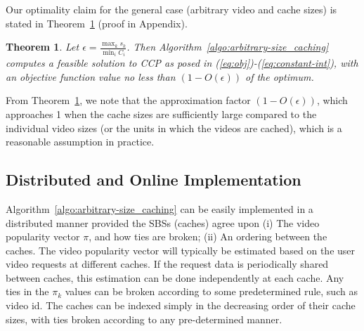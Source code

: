 \documentclass[conference]{IEEEtran}
\newtheorem{theorem}{Theorem}
\begin{document}
Our optimality claim for the general case (arbitrary video and cache sizes) is stated in Theorem~\ref{th:arbitrary-size} (proof in Appendix).

\begin{theorem}
\label{th:arbitrary-size}
Let $\epsilon = \frac{\max_k s_k}{\min_i C_i}$. Then Algorithm~\ref{algo:arbitrary-size_caching} computes a feasible solution to CCP as posed in (\ref{eq:obj})-(\ref{eq:constant-int}), with an objective function value no less than $(1 - O(\epsilon))$ of the optimum.
\end{theorem}

From Theorem~\ref{th:arbitrary-size}, we note that the approximation factor $(1 - O(\epsilon))$, which approaches 1 when the cache sizes are sufficiently large compared to the individual video sizes (or the units in which the videos are cached), which is a reasonable assumption in practice. 



\subsection{Distributed and Online Implementation}
Algorithm~\ref{algo:arbitrary-size_caching} can be easily implemented in a distributed manner provided the SBSs (caches) agree upon (i) The video popularity vector $\pi$, and how ties are broken; (ii) An ordering between the caches. The video popularity vector will typically be estimated based on the user video requests at different caches. If the request data is periodically shared between caches, this estimation can be done independently at each cache. 
Any ties in the $\pi_k$ values can be broken according to some predetermined rule, such as video id. 
The caches can be indexed simply in the decreasing order of their cache sizes, with ties broken according to any pre-determined manner.
\end{document}
